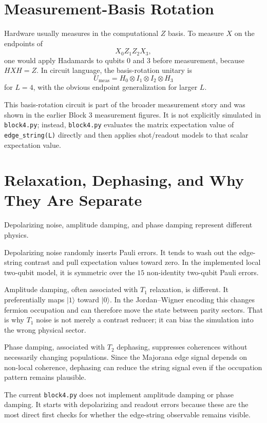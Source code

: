 \documentclass[11pt]{article}
\newcommand{\ket}[1]{|#1\rangle}
\begin{document}
\section{Measurement-Basis Rotation}

Hardware usually measures in the computational $Z$ basis. To measure $X$ on the endpoints of
\[
  X_0Z_1Z_2X_3,
\]
one would apply Hadamards to qubits $0$ and $3$ before measurement, because $HXH=Z$. In circuit language, the basis-rotation unitary is
\[
  U_{\mathrm{meas}}=H_0\otimes I_1\otimes I_2\otimes H_3
\]
for $L=4$, with the obvious endpoint generalization for larger $L$.

This basis-rotation circuit is part of the broader measurement story and was shown in the earlier Block 3 measurement figures. It is not explicitly simulated in \texttt{block4.py}; instead, \texttt{block4.py} evaluates the matrix expectation value of \texttt{edge\_string(L)} directly and then applies shot/readout models to that scalar expectation value.

\section{Relaxation, Dephasing, and Why They Are Separate}

Depolarizing noise, amplitude damping, and phase damping represent different physics.

Depolarizing noise randomly inserts Pauli errors. It tends to wash out the edge-string contrast and pull expectation values toward zero. In the implemented local two-qubit model, it is symmetric over the $15$ non-identity two-qubit Pauli errors.

Amplitude damping, often associated with $T_1$ relaxation, is different. It preferentially maps $\ket{1}$ toward $\ket{0}$. In the Jordan--Wigner encoding this changes fermion occupation and can therefore move the state between parity sectors. That is why $T_1$ noise is not merely a contrast reducer; it can bias the simulation into the wrong physical sector.

Phase damping, associated with $T_2$ dephasing, suppresses coherences without necessarily changing populations. Since the Majorana edge signal depends on non-local coherence, dephasing can reduce the string signal even if the occupation pattern remains plausible.

The current \texttt{block4.py} does not implement amplitude damping or phase damping. It starts with depolarizing and readout errors because these are the most direct first checks for whether the edge-string observable remains visible.
\end{document}
